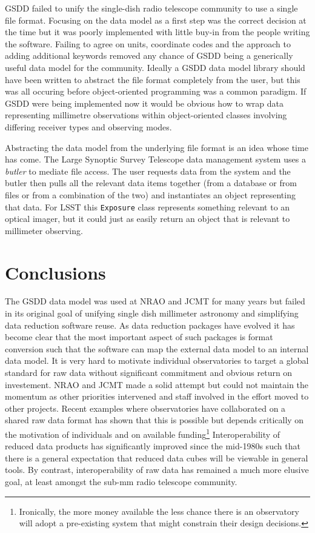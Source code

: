 \documentclass[final,authoryear,5p,times,twocolumn]{elsarticle}
\begin{document}
GSDD failed to unify the single-dish radio telescope community to use
a single file format. Focusing on the data model as a first step was
the correct decision at the time but it was poorly
implemented with little buy-in from the people writing the
software. Failing to agree on units, coordinate codes and the approach
to adding additional keywords removed any chance of GSDD being a
generically useful data model for the community.
Ideally a GSDD data model library should have been written to
abstract the file format completely from the user, but this was
all occuring before object-oriented programming was a common
paradigm. If GSDD were being implemented now it would be obvious how
to wrap data representing millimetre observations within object-oriented classes
involving differing receiver types and observing modes.

Abstracting the data model from the underlying file format is an idea
whose time has come. The Large Synoptic Survey Telescope data
management system \citep{2008arXiv0805.2366I,2010SPIE.7740E..1NK} uses
a \emph{butler} to mediate file access. The user requests data from
the system and the butler then pulls all the relevant data items
together (from a database or from files or from a combination of the
two) and instantiates an object representing that data. For LSST this
\texttt{Exposure} class represents something relevant to an optical
imager, but it could just as easily return an object that is relevant to
millimeter observing.

\section{Conclusions}

The GSDD data model was used at NRAO and JCMT for many years
but failed in its original goal of unifying single dish millimeter
astronomy and simplifying data reduction software reuse. As data
reduction packages have evolved it has become clear that the most
important aspect of such packages is format conversion such that the
software can map the external data model to an internal data model.
It is very hard to motivate individual observatories to target a
global standard for raw data without significant commitment and
obvious return on investement. NRAO and JCMT made a solid attempt but
could not maintain the momentum as other priorities intervened and
staff involved in the effort moved to other projects. Recent examples where observatories have
collaborated on a shared raw data format
\citep[e.g. MBFITS;][]{2006A&A...454L..25M} has shown that this is
possible but depends critically on the motivation of individuals and
on available funding\footnote{Ironically, the more money available the
  less chance there is an observatory will adopt a pre-existing system
  that might constrain their design decisions.}
 Interoperability of reduced data
products has significantly improved since the mid-1980s such that
there is a general expectation that reduced data cubes will be
viewable in general tools. By contrast, interoperability
of raw data has remained a much more elusive goal, at least amongst the
sub-mm radio telescope community.
\end{document}
